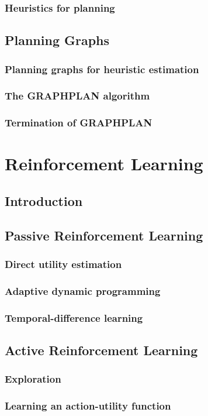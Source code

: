 \documentclass[11pt]{article}
\begin{document}
\subsubsection{Heuristics for planning}


\subsection{Planning Graphs}


\subsubsection{Planning graphs for heuristic estimation}


\subsubsection{The GRAPHPLAN algorithm}


\subsubsection{Termination of GRAPHPLAN}


\subsection{}



\newpage
\setcounter{section}{20}
\section{Reinforcement Learning}


\subsection{Introduction}


\subsection{Passive Reinforcement Learning}


\subsubsection{Direct utility estimation}


\subsubsection{Adaptive dynamic programming}


\subsubsection{Temporal-difference learning}


\subsection{Active Reinforcement Learning}


\subsubsection{Exploration}


\subsubsection{Learning an action-utility function}
\end{document}
